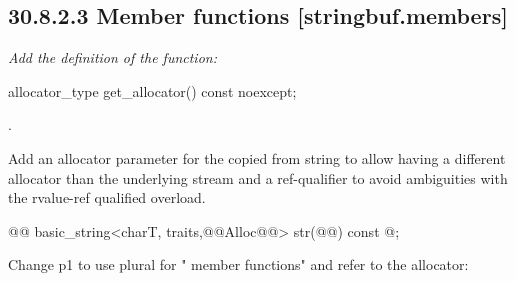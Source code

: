 \documentclass[ebook,11pt,article]{memoir}
\begin{document}
\subsection{30.8.2.3 Member functions [stringbuf.members]}
\textit{Add the definition of the  function:}
\begin{addedblock}
\begin{itemdecl}
allocator_type get_allocator() const noexcept;
\end{itemdecl}

\begin{itemdescr}
\pnum
\returns {}.

\end{itemdescr}
\end{addedblock}




Add an allocator parameter for the copied from string to allow having a different allocator than the underlying stream and a ref-qualifier to avoid ambiguities with the rvalue-ref qualified overload.
\begin{codeblock}
@@
basic_string<charT, traits,@@Alloc@@> str(@@) const @\added{\&};
\end{codeblock}

Change p1 to use plural for " member functions" and refer to the allocator:
\end{document}
